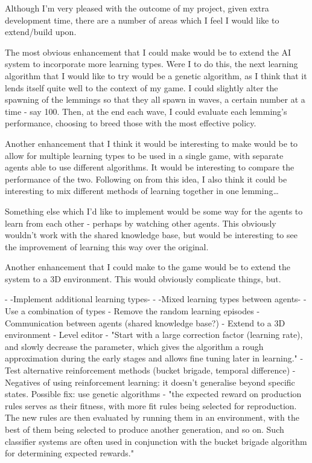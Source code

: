 \documentclass[a4paper,oneside]{report}
\begin{document}
Although I'm very pleased with the outcome of my project, given extra development time, there are a number of areas which I feel I would like to extend/build upon.

The most obvious enhancement that I could make would be to extend the AI system to incorporate more learning types. Were I to do this, the next learning algorithm that I would like to try would be a genetic algorithm, as I think that it lends itself quite well to the context of my game. I could slightly alter the spawning of the lemmings so that they all spawn in waves, a certain number at a time - say 100. Then, at the end each wave, I could evaluate each lemming's performance, choosing to breed those with the most effective policy.

Another enhancement that I think it would be interesting to make would be to allow for multiple learning types to be used in a single game, with separate agents able to use different algorithms. It would be interesting to compare the performance of the two. Following on from this idea, I also think it could be interesting to mix different methods of learning together in one lemming…

Something else which I'd like to implement would be some way for the agents to learn from each other - perhaps by watching other agents. This obviously wouldn't work with the shared knowledge base, but would be interesting to see the improvement of learning this way over the original.

Another enhancement that I could make to the game would be to extend the system to a 3D environment. This would obviously complicate things, but.

- -Implement additional learning types-
- -Mixed learning types between agents-
- Use a combination of types
- Remove the random learning episodes
- Communication between agents (shared knowledge base?)
- Extend to a 3D environment
- Level editor
- "Start with a large correction factor (learning rate), and slowly decrease the parameter, which gives the algorithm a rough approximation during the early stages and allows fine tuning later in learning."
- Test alternative reinforcement methods (bucket brigade, temporal difference)
- Negatives of using reinforcement learning: it doesn't generalise beyond specific states. Possible fix: use genetic algorithms - "the expected reward on production rules serves as their fitness, with more fit rules being selected for reproduction. The new rules are then evaluated by running them in an environment, with the best of them being selected to produce another generation, and so on. Such classifier systems are often used in conjunction with the bucket brigade algorithm for determining expected rewards." 
\end{document}

